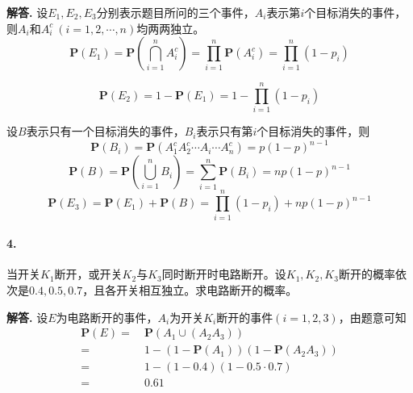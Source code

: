 \documentclass[12pt, a4paper, oneside]{ctexart}
\newenvironment{solution}{\par\noindent\textbf{解答. }}{\bigskip\par}
\begin{document}
\begin{solution}
    设$E_1,E_2,E_3$分别表示题目所问的三个事件，$A_i$表示第$i$个目标消失的事件，则$A_i$和$A_i^c\ (i=1,2,\cdots, n)$均两两独立。
    \begin{equation*}
        \textbf{P}(E_1) = \textbf{P}\left(\bigcap_{i=1}^nA_i^c\right) = \prod_{i=1}^n\textbf{P}(A_i^c) = \prod_{i=1}^n(1-p_i)
    \end{equation*}

    \begin{equation*}
        \textbf{P}(E_2) = 1-\textbf{P}(E_1) = 1-\prod_{i=1}^n(1-p_i)
    \end{equation*}

    设$B$表示只有一个目标消失的事件，$B_i$表示只有第$i$个目标消失的事件，则
    \begin{equation*}
        \textbf{P}(B_i) = \textbf{P}(A_1^cA_2^c\cdots A_i\cdots A_n^c) = p(1-p)^{n-1}
    \end{equation*}
    \begin{equation*}
        \textbf{P}(B) = \textbf{P}\left(\bigcup_{i=1}^nB_i\right) = \sum_{i=1}^n\textbf{P}(B_i) = np(1-p)^{n-1}
    \end{equation*}
    \begin{equation*}
        \textbf{P}(E_3) = \textbf{P}(E_1) + \textbf{P}(B) = \prod_{i=1}^n(1-p_i) + np(1-p)^{n-1}
    \end{equation*}
\end{solution}
\paragraph{4.}当开关$K_1$断开，或开关$K_2$与$K_3$同时断开时电路断开。设$K_1,K_2,K_3$断开的概率依次是$0.4,0.5,0.7$，且各开关相互独立。求电路断开的概率。
\begin{solution}
    设$E$为电路断开的事件，$A_i$为开关$K_i$断开的事件$(i=1,2,3)$，由题意可知
    \begin{equation*}
        \begin{aligned}
            \textbf{P}(E) =&\ \textbf{P}(A_1\cup(A_2A_3))\\
            =&\ 1-(1-\textbf{P}(A_1))(1-\textbf{P}(A_2A_3))\\
            =&\ 1-(1-0.4)(1-0.5\cdot 0.7)\\
            =&\ 0.61
        \end{aligned}
    \end{equation*}
\end{solution}
\end{document}
